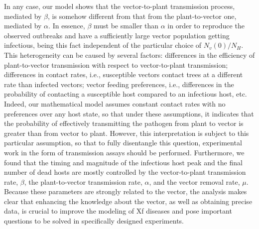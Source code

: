 In any case, our model shows that the vector-to-plant transmission process,
mediated by $\beta$, is somehow different from that from the plant-to-vector
one, mediated by $\alpha$. In essence, $\beta$ must be smaller than $\alpha$ in
order to reproduce the observed outbreaks and have a sufficiently large vector
population getting infectious, being this fact independent of the particular
choice of $N_v(0)/N_H$. This heterogeneity can be caused by several factors:
differences in the efficiency of plant-to-vector transmission with respect to
vector-to-plant transmission; differences in contact rates, i.e., susceptible
vectors contact trees at a different rate than infected vectors; vector feeding
preferences, i.e., differences in the probability of contacting a susceptible
host compared to an infectious host, etc. Indeed, our mathematical model
assumes constant contact rates with no preferences over any host state, so that
under these assumptions, it indicates that the probability of effectively
transmitting the pathogen from plant to vector is greater than from vector to
plant. However, this interpretation is subject to this particular assumption,
so that to fully disentangle this question, experimental work in the form of
transmission assays should be performed. Furthermore, we found that the timing
and magnitude of the infectious host peak and the final number of dead hosts
are mostly controlled by the vector-to-plant transmission rate, $\beta$, the
plant-to-vector transmission rate, $\alpha$, and the vector removal rate,
$\mu$. Because these parameters are strongly related to the vector, the
analysis makes clear that enhancing the knowledge about the vector, as well as
obtaining precise data, is crucial to improve the modeling of Xf diseases and
pose important questions to be solved in specifically designed experiments.


